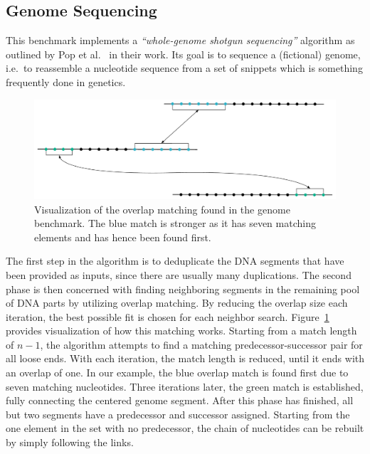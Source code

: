 \subsection{Genome Sequencing}
\label{sec:experiments:genome}
This benchmark implements a \emph{\enquote{whole-genome shotgun sequencing}} algorithm as outlined by Pop et al.~\cite{pop2002genome} in their work.
Its goal is to sequence a (fictional) genome, i.e.\ to reassemble a nucleotide sequence from a set of snippets which is something frequently done in genetics.

\begin{figure}[b]
    \includegraphics[width=\textwidth,keepaspectratio]{gfx/experiments-genome}
    \caption{Visualization of the overlap matching found in the genome benchmark. The blue match is stronger as it has seven matching elements and has hence been found first.}
    \label{fig:experiments:genome-example}
\end{figure}

The first step in the algorithm is to deduplicate the DNA segments that have been provided as inputs, since there are usually many duplications.
The second phase is then concerned with finding neighboring segments in the remaining pool of DNA parts by utilizing overlap matching.
By reducing the overlap size each iteration, the best possible fit is chosen for each neighbor search.
Figure~\ref{fig:experiments:genome-example} provides visualization of how this matching works.
Starting from a match length of $n-1$, the algorithm attempts to find a matching predecessor-successor pair for all loose ends.
With each iteration, the match length is reduced, until it ends with an overlap of one.
In our example, the blue overlap match is found first due to seven matching nucleotides.
Three iterations later, the green match is established, fully connecting the centered genome segment.
After this phase has finished, all but two segments have a predecessor and successor assigned.
Starting from the one element in the set with no predecessor, the chain of nucleotides can be rebuilt by simply following the links.

